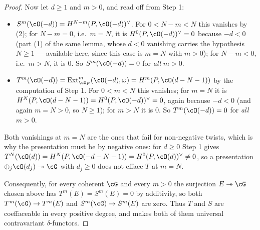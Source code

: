\begin{proof}
Now let $d\ge1$ and $m>0$, and read off from Step 1:
\begin{itemize}
\item $S^m(\cO(-d))=H^{N-m}(P,\cO(-d))^{\vee}$.  For $0<N-m<N$ this
vanishes by (2); for
$N-m=0$, i.e.\ $m=N$, it is $H^0(P,\cO(-d))^{\vee}=0$ because $-d<0$
(part (1) of the same lemma, whose $d<0$ vanishing carries the
hypothesis $N\ge1$ --- available here, since this case is
$m=N$ with $m>0$); for $N-m<0$, i.e.\ $m>N$,
it is $0$.  So $S^m(\cO(-d))=0$ for \emph{all} $m>0$.
\item $T^m(\cO(-d))=\operatorname{Ext}^m_{\cO_P}(\cO(-d),\omega)
=H^{m}(P,\cO(d-N-1))$ by the computation of Step 1.  For $0<m<N$
this vanishes; for $m=N$ it is
$H^N(P,\cO(d-N-1))=H^0(P,\cO(-d))^{\vee}=0$, again because $-d<0$
(and again $m=N>0$, so $N\ge1$);
for $m>N$ it is $0$.  So $T^m(\cO(-d))=0$ for \emph{all} $m>0$.
\end{itemize}
Both vanishings at $m=N$ are the ones that fail for non-negative
twists, which is why the presentation must be by negative ones: for
$d\ge0$ Step 1 gives
$T^N(\cO(d))=H^N(P,\cO(-d-N-1))=H^0(P,\cO(d))^{\vee}\neq0$, so a
presentation $\oplus_j\cO(d_j)\twoheadrightarrow\cG$ with $d_j\ge0$
does not efface $T$ at $m=N$.

Consequently, for every coherent $\cG$ and every $m>0$ the surjection
$E\twoheadrightarrow\cG$ chosen above has $T^m(E)=S^m(E)=0$ by
additivity, so both $T^m(\cG)\to T^m(E)$ and $S^m(\cG)\to S^m(E)$ are
zero.  Thus $T$ and $S$ are coeffaceable in every positive degree,
and  makes both of them universal
contravariant $\delta$-functors.


\end{proof}
